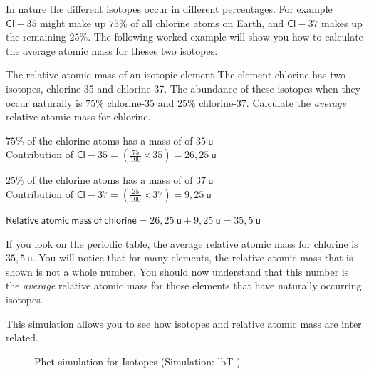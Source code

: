 \label{m38753*id248557}In nature the different isotopes occur in different percentages. For example $\mathsf{Cl}-35$ might make up $75\%$ of all chlorine atoms on Earth, and $\mathsf{Cl}-37$ makes up the remaining $25\%$. The following worked example will show you how to calculate the average atomic mass for thesee two isotopes: \par 
  \vspace{-1cm}    
\begin{wex}{The relative atomic mass of an isotopic element}{
The element chlorine has two isotopes, chlorine-35 and chlorine-37. The abundance of these isotopes when they occur naturally is $75\%$ chlorine-35 and $25\%$ chlorine-37. Calculate the \textit{average} relative atomic mass for chlorine.
}
{
$75\%$ of the chlorine atoms has a mass of of $35~\mathsf{u}$ \\
Contribution of $\mathsf{Cl-}35 = (\frac{75}{100} \times 35) = 26,25~\mathsf{u}$

$25\%$ of the chlorine atoms has a mass of of $37~\mathsf{u}$ \\ 
Contribution of $\mathsf{Cl-}37 = (\frac{25}{100} \times 37) = 9,25~\mathsf{u}$



$\mathsf{Relative~atomic~mass~of~chlorine} = 26,25~\mathsf{u} + 9,25~\mathsf{u} = 35,5~\mathsf{u}$ \\
}
\end{wex}
If you look on the periodic table, the average relative atomic mass for chlorine is $35,5~\mathsf{u}$. You will notice that for many elements, the relative atomic mass that is shown is not a whole number. You should now understand that this number is the \textit{average} relative atomic mass for those elements that have naturally occurring isotopes. \par

This simulation allows you to see how isotopes and relative atomic mass are inter related.
    \setcounter{subfigure}{0}
	\begin{figure}[H] %
    \textnormal{Phet simulation for Isotopes}\vspace{.1in} \nopagebreak
  \label{m38806*phet!!!underscore!!!sim}\label{m38806*phet-simulation}
             { (Simulation:  lbT )}
      \vspace{2pt}
    \vspace{.1in}
 \end{figure}           \par
\label{m38753*secfhsst!!!underscore!!!id400}\vspace{.5cm} 



